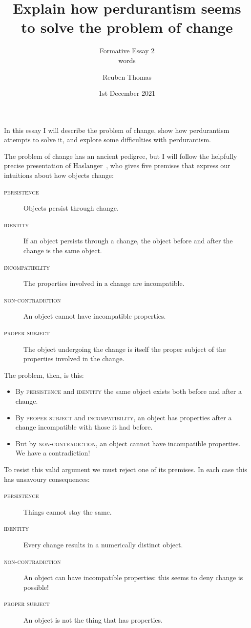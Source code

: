 \documentclass[english]{scrartcl}
\newcommand{\law}[1]{\textsc{#1}}
\begin{document}
\title{Explain how perdurantism seems to solve the problem of change}
\subtitle{Formative Essay 2\\words}
\author{Reuben Thomas}
\date{1st December 2021}
\maketitle

In this essay I will describe the problem of change, show how perdurantism attempts to solve it, and explore some difficulties with perdurantism.

The problem of change has an ancient pedigree, but I will follow the helpfully precise presentation of Haslanger~\cite{Haslanger2003-HASPTT}, who gives five premises that express our intuitions about how objects change:

\begin{description}
\item[\law{persistence}]Objects persist through change.
\item[\law{identity}]If an object persists through a change, the object
  before and after the change is the same object.
\item[\law{incompatibility}]The properties involved in a change are incompatible.
\item[\law{non-contradiction}]An object cannot have incompatible properties.
\item[\law{proper subject}]The object undergoing the change is itself the proper subject of the properties involved in the change.
\end{description}

The problem, then, is this:

\begin{itemize}
\item By \law{persistence} and \law{identity} the same object exists both before and after a change.
\item By \law{proper subject} and \law{incompatibility}, an object has properties after a change incompatible with those it had before.
\item But by \law{non-contradiction}, an object cannot have incompatible properties. We have a contradiction!
\end{itemize}

To resist this valid argument we must reject one of its premises. In each case this has unsavoury consequences:

\begin{description}
\item[\law{persistence}]Things cannot stay the same.
\item[\law{identity}]Every change results in a numerically distinct object.
\item[\law{non-contradiction}]An object can have incompatible properties: this seems to deny change is possible!
\item[\law{proper subject}]An object is not the thing that has properties.
\end{description}
\end{document}
